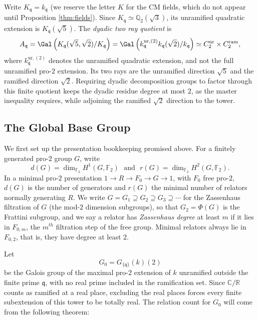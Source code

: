 Write $K_{\mathfrak{q}}=k_{\mathfrak{q}}$ (we reserve the letter $K$ for the CM fields, which do not appear until Proposition \ref{thm:fields}).  Since $K_{\mathfrak{q}}\simeq\mathbb{Q}_2(\sqrt3)$, its unramified quadratic extension is $K_{\mathfrak{q}}(\sqrt5)$.  The \emph{dyadic two ray quotient} is
\begin{equation}\label{eq:Aq}
  A_{\mathfrak{q}}
  =\Gal\left(K_{\mathfrak{q}}(\sqrt5,\sqrt2)/K_{\mathfrak{q}}\right)
  =\Gal\left(k_{\mathfrak{q}}^{\mathrm{ur},(2)}k_{\mathfrak{q}}(\sqrt2)/k_{\mathfrak{q}}\right)
  \simeq C_2^{\mathrm{ur}}\times C_2^{\mathrm{ram}},
\end{equation}
where $k_{\mathfrak{q}}^{\mathrm{ur},(2)}$ denotes the unramified quadratic extension, and not the full unramified pro-$2$ extension.  Its two rays are the unramified direction $\sqrt5$ and the ramified direction $\sqrt2$.  Requiring dyadic decomposition groups to factor through this finite quotient keeps the dyadic residue degree at most $2$, as the master inequality requires, while adjoining the ramified $\sqrt2$ direction to the tower.

\subsection{The Global Base Group}

We first set up the presentation bookkeeping promised above.  For a finitely generated pro-$2$ group $G$, write
\[
  d(G)=\dim_{\mathbb{F}_2}H^1(G,\mathbb{F}_2)
  \ \ \ \text{and}\ \ \
  r(G)=\dim_{\mathbb{F}_2}H^2(G,\mathbb{F}_2).
\]
In a minimal pro-$2$ presentation $1\to R\to F_0\to G\to1$, with $F_0$ free pro-$2$, $d(G)$ is the number of generators and $r(G)$ the minimal number of relators normally generating $R$.  We write $G=G_1\supseteq G_2\supseteq G_3\supseteq\cdots$ for the Zassenhaus filtration of $G$ (the mod-$2$ dimension subgroups), so that $G_2=\Phi(G)$ is the Frattini subgroup, and we say a relator has \emph{Zassenhaus degree} at least $m$ if it lies in $F_{0,m}$, the $m^{th}$ filtration step of the free group.  Minimal relators always lie in $F_{0,2}$, that is, they have degree at least $2$.

Let
\[
   G_0=G_{\{\mathfrak{q}\}}(k)(2)
\]
be the Galois group of the maximal pro-$2$ extension of $k$ unramified outside the finite prime $\mathfrak{q}$, with no real prime included in the ramification set.  Since $\mathbb{C}/\mathbb{R}$ counts as ramified at a real place, excluding the real places forces every finite subextension of this tower to be totally real.  The relation count for $G_0$ will come from the following theorem:

